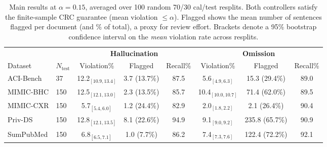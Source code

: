 \begin{table}[t]
\centering
\small
\caption{Main results at $\alpha=0.15$, averaged over 100 random 70/30 cal/test resplits. Both controllers satisfy the finite-sample CRC guarantee (mean violation $\le \alpha$). Flagged shows the mean number of sentences flagged per document (and \% of total), a proxy for review effort. Brackets denote a 95\% bootstrap confidence interval on the \emph{mean} violation rate across resplits.}
\label{tab:main-results}
\begin{tabular}{ll ccc ccc}
\toprule
& & \multicolumn{3}{c}{\textbf{Hallucination}} & \multicolumn{3}{c}{\textbf{Omission}} \\
\cmidrule(lr){3-5} \cmidrule(lr){6-8}
Dataset & $N_{\text{test}}$ & Violation\% & Flagged & Recall\% & Violation\% & Flagged & Recall\% \\
\midrule
ACI-Bench & 37 & 12.2$_{[10.9,13.4]}$ & 3.7 (13.7\%) & 87.5 & 5.6$_{[4.9,6.3]}$ & 15.3 (29.4\%) & 89.0 \\
MIMIC-BHC & 150 & 12.5$_{[12.1,13.0]}$ & 2.3 (13.5\%) & 85.7 & 10.4$_{[10.0,10.7]}$ & 71.4 (62.0\%) & 89.5 \\
MIMIC-CXR & 150 & 5.7$_{[5.4,6.0]}$ & 1.2 (24.4\%) & 82.9 & 2.0$_{[1.8,2.2]}$ & 2.1 (26.4\%) & 90.4 \\
Priv-DS & 150 & 12.8$_{[12.1,13.5]}$ & 8.1 (22.6\%) & 94.9 & 9.1$_{[9.0,9.2]}$ & 235.8 (65.7\%) & 90.9 \\
SumPubMed & 150 & 6.8$_{[6.5,7.1]}$ & 1.0 (7.7\%) & 86.2 & 7.4$_{[7.3,7.6]}$ & 122.4 (72.2\%) & 92.1 \\
\bottomrule
\end{tabular}
\end{table}